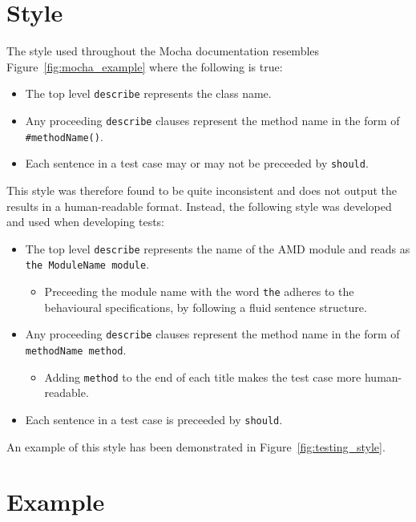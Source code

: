 \section{Style} {
\label{sec:testing_style}

	The style used throughout the Mocha documentation resembles Figure~\ref{fig:mocha_example} where the following is true:

	\begin{itemize}
		\item The top level \texttt{describe} represents the class name.
		\item Any proceeding \texttt{describe} clauses represent the method name in the form of \texttt{\#methodName()}.
		\item Each sentence in a test case may or may not be preceeded by \texttt{should}.
	\end{itemize}

	This style was therefore found to be quite inconsistent and does not output the results in a human-readable format. Instead, the following style was developed and used when developing tests:

	\begin{itemize}
		\item The top level \texttt{describe} represents the name of the AMD module and reads as \texttt{the ModuleName module}.
			\begin{itemize}
				\item Preceeding the module name with the word \texttt{the} adheres to the behavioural specifications, by following a fluid sentence structure.
			\end{itemize}
		\item Any proceeding \texttt{describe} clauses represent the method name in the form of \texttt{methodName method}.
			\begin{itemize}
				\item Adding \texttt{method} to the end of each title makes the test case more human-readable.
			\end{itemize}
		\item Each sentence in a test case is preceeded by \texttt{should}.
	\end{itemize}

	An example of this style has been demonstrated in Figure~\ref{fig:testing_style}.

	

}

\section{Example} {
\label{sec:testing_examples}

	

}

